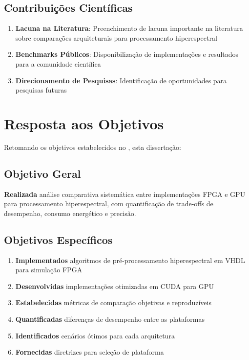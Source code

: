 \subsection{Contribuições Científicas}
\begin{enumerate}
    \item \textbf{Lacuna na Literatura}: Preenchimento de lacuna importante na literatura sobre comparações arquiteturais para processamento hiperespectral
    \item \textbf{Benchmarks Públicos}: Disponibilização de implementações e resultados para a comunidade científica
    \item \textbf{Direcionamento de Pesquisas}: Identificação de oportunidades para pesquisas futuras
\end{enumerate}

\section{Resposta aos Objetivos}\label{sec:resposta_objetivos}

Retomando os objetivos estabelecidos no , esta dissertação:

\subsection{Objetivo Geral}
\checkmark \textbf{Realizada} análise comparativa sistemática entre implementações FPGA e GPU para processamento hiperespectral, com quantificação de trade-offs de desempenho, consumo energético e precisão.

\subsection{Objetivos Específicos}
\begin{enumerate}
    \item \checkmark \textbf{Implementados} algoritmos de pré-processamento hiperespectral em VHDL para simulação FPGA
    \item \checkmark \textbf{Desenvolvidas} implementações otimizadas em CUDA para GPU
    \item \checkmark \textbf{Estabelecidas} métricas de comparação objetivas e reproduzíveis
    \item \checkmark \textbf{Quantificadas} diferenças de desempenho entre as plataformas
    \item \checkmark \textbf{Identificados} cenários ótimos para cada arquitetura
    \item \checkmark \textbf{Fornecidas} diretrizes para seleção de plataforma
\end{enumerate}

